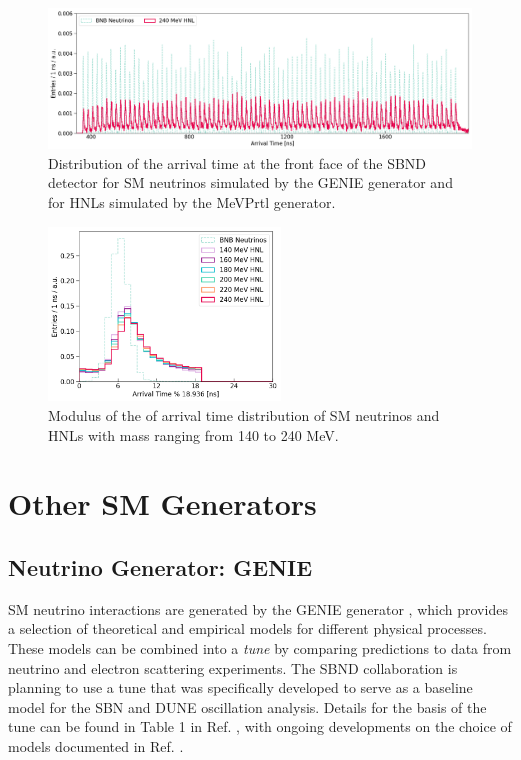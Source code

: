 \begin{figure}[htbp!] 
\centering    
\includegraphics[width=1.0\textwidth]{full_beam}
\caption[full_beam]{
Distribution of the arrival time at the front face of the SBND detector for SM neutrinos simulated by the GENIE generator and for HNLs simulated by the MeVPrtl generator. 
}
\label{fig:full_beam}
\end{figure}
\begin{figure}[htbp!] 
\centering    
\includegraphics[width=0.55\textwidth]{beam_modulus}
\caption[beam_modulus]{
Modulus of the of arrival time distribution of SM neutrinos and HNLs with mass ranging from 140 to 240 MeV. 
}
\label{fig:beam_modulus}
\end{figure}

\newpage
\section{Other SM Generators}
\label{sec:gen_sm}

\subsection{Neutrino Generator: GENIE}
\label{sec:gen_genie}

SM neutrino interactions are generated by the GENIE generator \cite{genie}, which provides a selection of theoretical and empirical models for different physical processes.
These models can be combined into a \textit{tune} by comparing predictions to data from neutrino and electron scattering experiments.
The SBND collaboration is planning to use a tune that was specifically developed to serve as a baseline model for the SBN and DUNE oscillation analysis.
Details for the basis of the tune can be found in Table 1 in Ref. \cite{genie_tune}, with ongoing developments on the choice of models documented in Ref. \cite{genie_tune_github}.  

